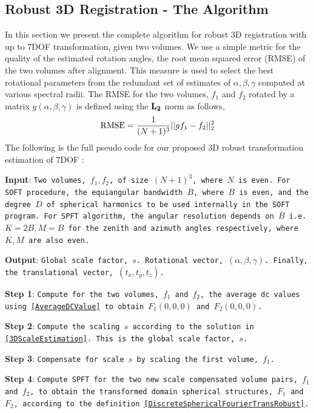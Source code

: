\documentclass{UCF_ETD}
\begin{document}
\subsection{Robust 3D Registration - The Algorithm}
In this section we present the complete algorithm for robust 3D registration with up to $7$DOF transformation, given two volumes. We use a simple metric for the quality of the estimated rotation angles, the root mean squared error (RMSE) of the two volumes after alignment. This measure is used to select the best rotational parameters from the redundant set of estimates of $\alpha, \beta, \gamma$ computed at various spectral radii. The RMSE for the two volumes, $f_1$ and $f_2$ rotated by a matrix $g(\alpha,\beta,\gamma)$ is defined using the ${\bf L_2}$ norm as follows, 
\begin{eqnarray} \label{RMSE_Definition}
{\rm RMSE}  = {\frac{1}{(N+1)^3} ||g f_1 - f_2||^2_2}
\end{eqnarray}
The following is the full pseudo code for our proposed $3$D robust transformation estimation of $7$DOF :  %

\textbf{Input}: {\tt Two volumes, $f_1, f_2$, of size $(N+1)^3$, where $N$ is even. For SOFT procedure, the equiangular bandwidth $B$, where $B$ is even, and the degree $D$ of spherical harmonics to be used internally in the SOFT program. For SPFT algorithm, the angular resolution depends on $B$ i.e. $K = 2B, M=B$ for the  zenith and azimuth angles respectively, where $K,M$ are also even.}

\textbf{Output}:  {\tt Global scale factor, $s$. Rotational vector, $(\alpha,\beta,\gamma)$. Finally, the translational vector, $(t_x,t_y,t_z)$. }

\textbf{Step 1}: {\tt Compute for the two volumes, $f_1$ and $f_2$, the average dc values using \eqref{AverageDCValue} to obtain $F_1(0,0,0)$ and $F_2(0,0,0)$.}

\textbf{Step 2}: {\tt Compute the scaling $s$ according to the solution in \eqref{3DScaleEstimation}. This is the global scale factor, $s$.}

\textbf{Step 3}: {\tt Compensate for scale $s$ by scaling the first volume, $f_1$.}

\textbf{Step 4}: {\tt Compute SPFT for the two new scale compensated volume pairs, $f_1$ and $f_2$, to obtain the transformed domain spherical structures, $F_1$ and $F_2$, according to the definition \eqref{DiscreteSphericalFourierTransRobust}.}
\end{document}
